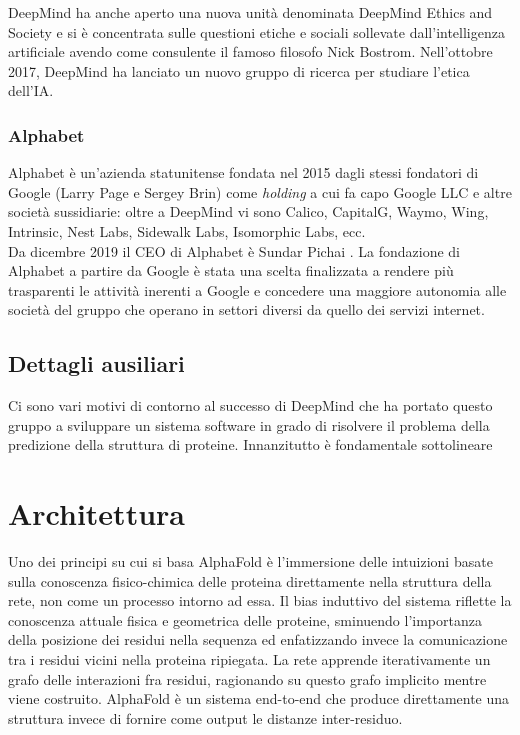 {{DeepMind ha anche aperto una nuova unità denominata DeepMind Ethics and Society e si è concentrata sulle questioni etiche e sociali sollevate dall'intelligenza artificiale avendo come consulente il famoso filosofo Nick Bostrom. Nell'ottobre 2017, DeepMind ha lanciato un nuovo gruppo di ricerca per studiare l'etica dell'IA.

\subsubsection{Alphabet}
Alphabet è un'azienda statunitense fondata nel 2015 dagli stessi fondatori di Google (Larry Page e Sergey Brin) come \textit{holding} a cui fa capo Google LLC e altre società sussidiarie: oltre a DeepMind vi sono Calico, CapitalG, Waymo, Wing, Intrinsic, Nest Labs, Sidewalk Labs, Isomorphic Labs, ecc.\\ 
Da dicembre 2019 il CEO di Alphabet è Sundar Pichai \supercite{cnbc}.
La fondazione di Alphabet a partire da Google è stata una scelta finalizzata a rendere più trasparenti le attività inerenti a Google e concedere una maggiore autonomia alle società del gruppo che operano in settori diversi da quello dei servizi internet.

}

\subsection{Dettagli ausiliari}


Ci sono vari motivi di contorno al successo di DeepMind che ha portato questo gruppo a sviluppare un sistema software in grado di risolvere il problema della predizione della struttura di proteine. Innanzitutto è fondamentale sottolineare 
}


\section{Architettura}

Uno dei principi su cui si basa AlphaFold è l'immersione delle intuizioni basate sulla conoscenza fisico-chimica delle proteina direttamente nella struttura della rete, non come un processo intorno ad essa. Il bias induttivo del sistema riflette la conoscenza attuale fisica e geometrica delle proteine, sminuendo l'importanza della posizione dei residui nella sequenza ed enfatizzando invece la comunicazione tra i residui vicini nella proteina ripiegata. La rete apprende iterativamente un grafo delle interazioni fra residui, ragionando su questo grafo implicito mentre viene costruito. AlphaFold è un sistema end-to-end che produce direttamente una struttura invece di fornire come output le distanze inter-residuo.

